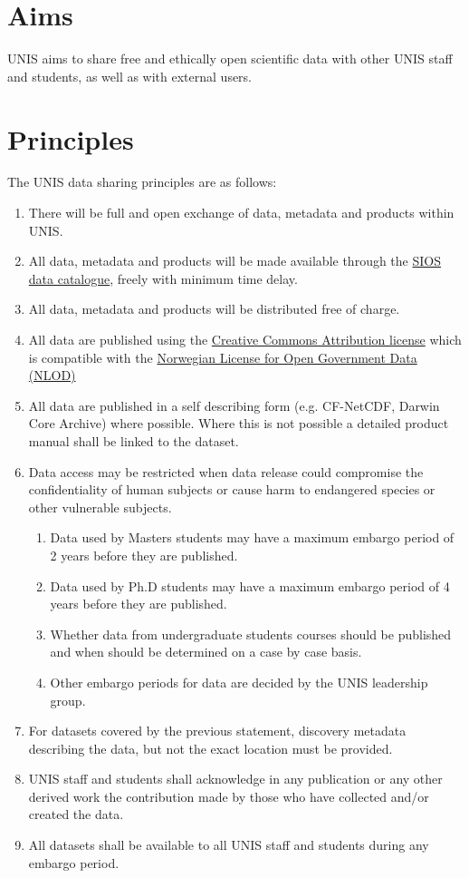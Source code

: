 \documentclass[a4paper,english, 11pt]{article}
\begin{document}
\section{Aims}
\label{s:aims}

UNIS aims to share free and ethically open scientific data with other UNIS staff and students, as well as with external users. 

\section{Principles}
\label{s:principles}

The UNIS data sharing principles are as follows:

\begin{enumerate}[I]
\item There will be full and open exchange of data, metadata and products within UNIS.
\item All data, metadata and products will be made available through the \href{https://sios-svalbard.org/metsis/search}{SIOS data catalogue}, freely with minimum time delay.
\item All data, metadata and products will be distributed free of charge.
\item All data are published using the \href{https://creativecommons.org/licenses/by/4.0/}{Creative Commons Attribution license} which is
compatible with the \href{https://data.norge.no/nlod/en}{Norwegian License for Open Government Data (NLOD)}
\item All data are published in a self describing form (e.g. CF-NetCDF, Darwin Core Archive) where possible. Where this is not possible a detailed product manual shall be linked to the dataset.
\item Data access may be restricted when data release could compromise the confidentiality
of human subjects or cause harm to endangered species or other vulnerable subjects.
\begin{enumerate}[A]
\item Data used by Masters students may have a maximum embargo period of 2 years before
they are published.
\item Data used by Ph.D students may have a maximum embargo period of 4 years before
they are published.
\item Whether data from undergraduate students courses should be published and when should be determined on a case by case basis.
\item Other embargo periods for data are decided by the UNIS leadership group.
\end{enumerate}
\item For datasets covered by the previous statement, discovery metadata describing the data, but not the exact location must be provided.
\item UNIS staff and students shall acknowledge in any publication or any other derived work the contribution made by those who have collected and/or created the data.
\item All datasets shall be available to all UNIS staff and students during any embargo period.
\end{enumerate}
\end{document}
